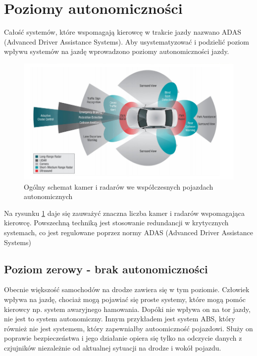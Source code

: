 \section{Poziomy autonomiczności}

Całość systemów, które wspomagają kierowcę w trakcie jazdy nazwano ADAS (Advanced Driver Assistance Systems). Aby usystematyzować  i podzielić poziom wpływu systemów na jazdę wprowadzono poziomy autonomiczności jazdy.

\begin{figure}
  \centering
  \includegraphics[width=13cm]{img/systemy_autonomiczne_ogolnie.png}
  \caption{Ogólny schemat kamer i radarów we współczesnych pojazdach autonomicznych\cite{S1}}
  \label{fig:kamery_i_radary}
\end{figure}

Na rysunku \ref{fig:kamery_i_radary} daje się zauważyć znaczna liczba kamer i radarów wspomagająca kierowcę. Powszechną techniką jest stosowanie redundancji w krytycznych systemach, co jest regulowane poprzez normy ADAS (Advanced Driver Assistance Systems)

\subsection{Poziom zerowy - brak autonomiczności}
Obecnie większość samochodów na drodze zawiera się w tym poziomie. Człowiek wpływa na jazdę, chociaż mogą pojawiać się proste systemy, które mogą pomóc kierowcy np. system awaryjnego hamowania. Dopóki nie wpływa on na tor jazdy, nie jest to system autonomiczny. Innym przykładem jest system ABS, który również nie jest systemem, który zapewniałby autoomiczność pojazdowi. Służy on poprawie bezpieczeństwa i jego działanie opiera się tylko na odczycie danych z czjujników niezależnie od aktualnej sytuacji na drodze i wokół pojazdu.


